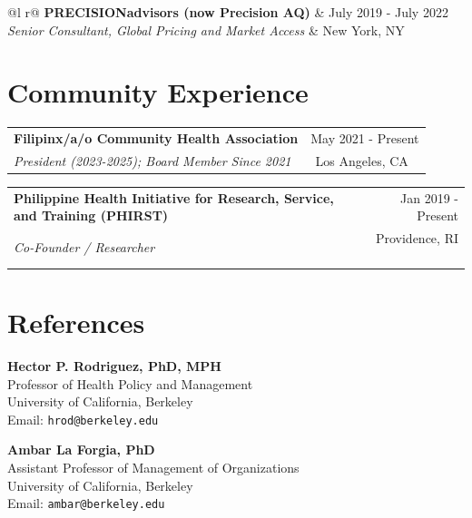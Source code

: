 \documentclass[letterpaper,11pt]{article}
\begin{document}
\begin{tabularx}{\linewidth}{ @{}l r@{} }
\textbf{PRECISIONadvisors (now Precision AQ)} & \hfill July 2019 - July 2022 \\
\textit{Senior Consultant, Global Pricing and Market Access} & \hfill New York, NY \\[3.75pt]
\end{tabularx}

\section{Community Experience}
\begin{tabularx}{\linewidth}{ @{}X r@{} }
\textbf{Filipinx/a/o Community Health Association} & \hfill May 2021 - Present \\
\textit{President (2023-2025); Board Member Since 2021} & \hfill Los Angeles, CA \
\end{tabularx}

\begin{tabularx}{\linewidth}{ @{}X r@{} }
\textbf{Philippine Health Initiative for Research, Service, and Training (PHIRST)} & \hfill Jan 2019 - Present \\
\textit{Co-Founder / Researcher} & \hfill Providence, RI \
\end{tabularx}

\section{References}

\begin{minipage}[t]{0.48\textwidth}
    \textbf{Hector P. Rodriguez, PhD, MPH} \\
    Professor of Health Policy and Management \\
    University of California, Berkeley \\
    \small{Email: \texttt{hrod@berkeley.edu}}
\end{minipage}
\hfill
\begin{minipage}[t]{0.48\textwidth}
    \textbf{Ambar La Forgia, PhD} \\
    Assistant Professor of Management of Organizations \\
    University of California, Berkeley \\
    \small{Email: \texttt{ambar@berkeley.edu}}
\end{minipage}
\end{document}
